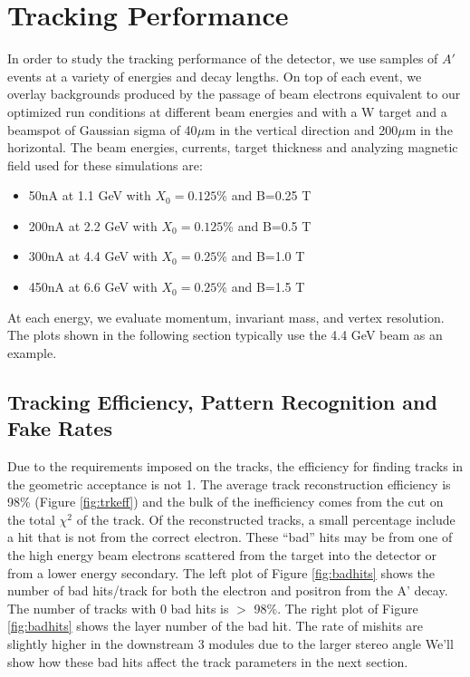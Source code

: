 \section{Tracking Performance}
\label{sec:trkperf}


In order to study the tracking performance of the detector, we use samples of $A'$ events 
at a variety of energies and decay lengths.  On top of each event, we overlay backgrounds 
produced by the passage of  beam electrons equivalent to our optimized run conditions at
different beam energies and with a W target and a beamspot of Gaussian sigma of 40$\mu$m in the vertical direction and 
200$\mu$m in the horizontal. The beam energies, currents, target thickness and analyzing magnetic field  used for these simulations are:
\begin{itemize}
\item 50nA at 1.1 GeV with $X_0=0.125$\% and  B=0.25 T
\item 200nA at 2.2 GeV with $X_0=0.125$\% and  B=0.5 T
\item 300nA at 4.4 GeV with $X_0=0.25$\% and  B=1.0 T
\item 450nA at 6.6 GeV with $X_0=0.25$\% and  B=1.5 T
\end{itemize}
At each energy, we evaluate momentum, invariant mass, and vertex resolution.  The plots shown in the following section typically use the 4.4 GeV beam as an example.  

\subsection{Tracking Efficiency, Pattern Recognition and Fake Rates}

Due to the requirements imposed on the tracks, the efficiency for finding tracks in the 
geometric acceptance is not 1. The average track reconstruction efficiency is 98\% (Figure \ref{fig:trkeff}) and 
the bulk of the inefficiency comes from the cut on the total $\chi^2$ of the track. 
Of the reconstructed tracks, a small percentage include a hit that is not from 
the correct electron.  These ``bad'' hits may be from one of the high energy beam 
electrons scattered from the target into the detector or from a lower energy secondary.  
The left plot of Figure \ref{fig:badhits} shows the number of bad hits/track for both the electron 
and positron from the A' decay.  The number of tracks with 0 bad hits is $>$ 98\%.
The right plot of Figure \ref{fig:badhits} shows the layer number of the bad hit.  
The rate of mishits are slightly higher in the downstream 3 modules due to the larger stereo angle %
We'll show how these bad hits affect the track parameters in the next section.


